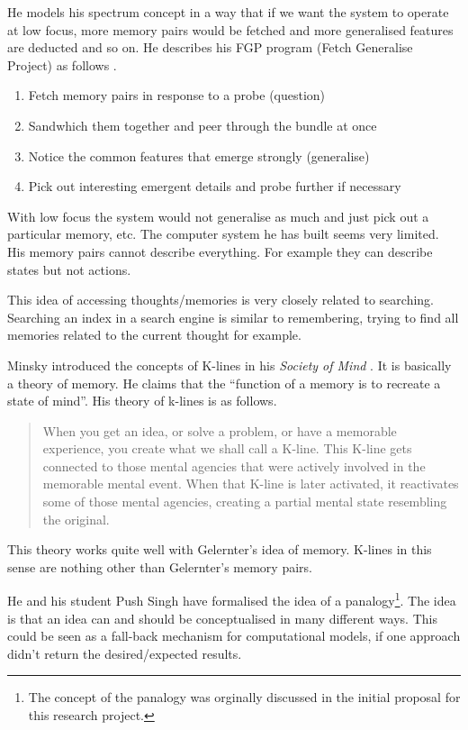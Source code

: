 He models his spectrum concept in a way that if we want the system to operate at low focus, more memory pairs would be fetched and more generalised features are deducted and so on. He describes his FGP program (Fetch Generalise Project) as follows \autocite[p.132]{Gelernter1994}.

\begin{enumerate}
  \item Fetch memory pairs in response to a probe (question)
  \item Sandwhich them together and peer through the bundle at once
  \item Notice the common features that emerge strongly (generalise)
  \item Pick out interesting emergent details and probe further if necessary
\end{enumerate}

With low focus the system would not generalise as much and just pick out a particular memory, etc. The computer system he has built seems very limited. His memory pairs cannot describe everything. For example they can describe states but not actions.

This idea of accessing thoughts/memories is very closely related to searching. Searching an index in a search engine is similar to remembering, trying to find all memories related to the current thought for example.

\spirals

Minsky introduced the concepts of K-lines in his \textit{Society of Mind} \citeyear{Minsky1980, Minsky1988}. It is basically a theory of memory. He claims that the ``function of a memory is to recreate a state of mind''. His theory of k-lines is as follows.

\begin{quotation}
  When you get an idea, or solve a problem, or have a memorable experience, you create what we shall call a K-line. This K-line gets connected to those mental agencies that were actively involved in the memorable mental event. When that K-line is later activated, it reactivates some of those mental agencies, creating a partial mental state resembling the original. 
\end{quotation}

This theory works quite well with Gelernter's idea of memory. K-lines in this sense are nothing other than Gelernter's memory pairs.

He and his student Push Singh have formalised the idea of a panalogy\footnote{The concept of the panalogy was orginally discussed in the initial proposal for this research project.}. The idea is that an idea can and should be conceptualised in many different ways. This could be seen as a fall-back mechanism for computational models, if one approach didn't return the desired/expected results.

